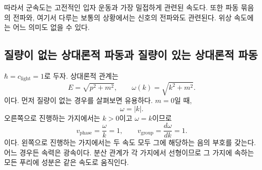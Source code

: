 \begin{classroomqa}
\end{classroomqa}

따라서 군속도는 고전적인 입자 운동과 가장 밀접하게 관련된 속도다. 또한 파동 묶음의 전파와, 여기서 다루는 보통의 상황에서는 신호의 전파와도 관련된다. 위상 속도에는 어느 의미도 없을 수 있다.

\subsection{질량이 없는 상대론적 파동과 질량이 있는 상대론적 파동}

\begin{classroomqa}
\end{classroomqa}

\begin{classroomqa}
\end{classroomqa}

\(\hbar=c_{\mathrm{light}}=1\)로 두자. 상대론적 관계는
\begin{equation}
E=\sqrt{p^2+m^2},
\qquad
\omega(k)=\sqrt{k^2+m^2}.
\end{equation}
이다. 먼저 질량이 없는 경우를 살펴보면 유용하다. \(m=0\)일 때,
\begin{equation}
\omega=|k|.
\end{equation}
오른쪽으로 진행하는 가지에서는 \(k>0\)이고 \(\omega=k\)이므로
\begin{equation}
v_{\mathrm{phase}}=\frac{\omega}{k}=1,
\qquad
v_{\mathrm{group}}=\frac{d\omega}{dk}=1.
\end{equation}
이다. 왼쪽으로 진행하는 가지에서는 두 속도 모두 그에 해당하는 음의 부호를 갖는다. 어느 경우든 속력은 광속이다. 분산 관계가 각 가지에서 선형이므로 그 가지에 속하는 모든 푸리에 성분은 같은 속도로 움직인다.

